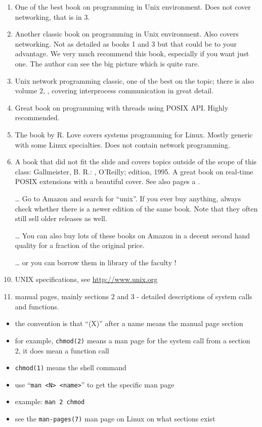 \begin{enumerate}
\item One of the best book on programming in Unix environment.  Does not cover
net\-work\-ing, that is in 3.
\item Another classic book on programming in Unix environment.  Also covers
net\-work\-ing.  Not as detailed as books 1 and 3 but that could be to your
advantage.  We very much recommend this book, especially if you want just one.
The author can see the big picture which is quite rare.
\item Unix network programming classic, one of the best on the topic; there is
also volume 2, , covering interprocess communication in great detail.
\item Great book on programming with threads using POSIX API.  Highly
recommended.
\item The book by R. Love covers systems programming for Linux. Mostly generic
with some Linux specialties. Does not contain network programming.
\item {} A book that did not fit the slide and covers topics outside
of the scope of this class: Gall\-meis\-ter, B. R.: , O'Reilly;  edition, 1995.  A great
book on real-time POSIX extensions with a beautiful cover.  See also pages
\pageref{REALTIMEEXTENSIONS} a \pageref{SIGWAITINFO}.
\item[\ldots] Go to Amazon and search for ``unix''.  If you ever buy anything,
always check whether there is a newer edition of the same book.  Note that they
often still sell older releases as well.
\item[\ldots] You can also buy lots of these books on Amazon in a decent second
hand quality for a fraction of the original price.
\item[\ldots] or you can borrow them in library of the faculty !
\item UNIX specifications, see \url{http://www.unix.org}
\item manual pages, mainly sections 2 and 3 - detailed descriptions of system
calls and functions.
\end{enumerate}


\begin{slide}
\begin{itemize}
\item the convention is that ``(X)'' after a name means the manual page section
\item for example, \texttt{chmod(2)} means a man page for the system call from a
section 2, it does  mean a function call
\item \texttt{chmod(1)} means the shell command
\item use ``\texttt{man <N> <name>}'' to get the specific man page
\item example: \texttt{man 2 chmod}
\item see the \texttt{man-pages(7)} man page on Linux on what sections exist
\end{itemize}
\end{slide}

